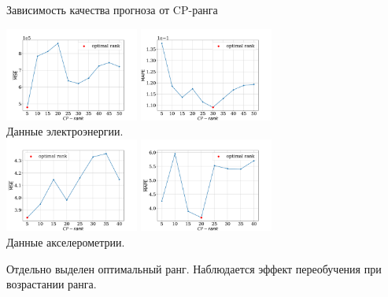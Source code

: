\documentclass[10pt]{beamer}
\theoremstyle{definition}
\begin{document}
	\begin{frame}{Зависимость качества прогноза от CP-ранга}
		
		\begin{center}
			\includegraphics[width=0.33\textwidth, keepaspectratio]{../../experiments/electricity/tssa/figs/prediction/MSE_rank.png}
			\includegraphics[width=0.33\textwidth, keepaspectratio]{../../experiments/electricity/tssa/figs/prediction/MAPE_rank.png} \\
			{\small Данные электроэнергии.} \\
			\includegraphics[width=0.33\textwidth, keepaspectratio]{../../experiments/motion_1/tssa/figs/prediction/MSE_rank.png}
			\includegraphics[width=0.33\textwidth, keepaspectratio]{../../experiments/motion_1/tssa/figs/prediction/MAPE_rank.png} \\
			{\small Данные акселерометрии.} \\
		\end{center}
		
		Отдельно выделен оптимальный ранг. Наблюдается эффект переобучения при возрастании ранга.
		
	\end{frame}
	
\end{document}
